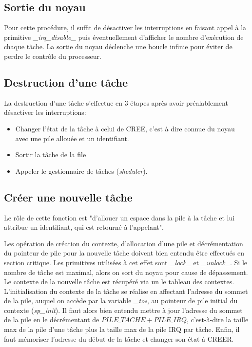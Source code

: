 \subsection{Sortie du noyau}
Pour cette procédure, il suffit de désactiver les interruptions en faisant appel à la primitive \textit{\_irq\_disable\_} puis éventuellement d'afficher le nombre d'exécution de chaque tâche. La sortie du noyau déclenche une boucle infinie pour éviter de perdre le contrôle du processeur.
%

\subsection{Destruction d'une tâche}
La destruction d'une tâche s'effectue en 3 étapes après avoir préalablement désactiver les interruptions:
\begin{itemize}
    \item Changer l'état de la tâche à celui de CREE, c'est à dire connue du noyau avec une pile allouée et un identifiant.
    \item Sortir la tâche de la file
    \item Appeler le gestionnaire de tâches (\textit{sheduler}).
\end{itemize}
%

\subsection{Créer une nouvelle tâche}
Le rôle de cette fonction est "d'allouer un espace dans la pile à la tâche et lui attribue un identifiant, qui est retourné à l’appelant".

Les opération de création du contexte, d'allocation d'une pile et décrémentation du pointeur de pile pour la nouvelle tâche doivent bien entendu être effectués en section critique. Les primitives utilisées à cet effet sont \textit{\_lock\_} et \textit{\_unlock\_}. Si le nombre de tâche est maximal, alors on sort du noyau pour cause de dépassement. Le contexte de la nouvelle tâche est récupéré via un le tableau des contextes. L'initialisation du contexte de la tâche se réalise en affectant l'adresse du sommet de la pile, auquel on accède par la variable \textit{\_tos}, au pointeur de pile initial du contexte (\textit{sp\_init}). Il faut alors bien entendu mettre à jour l'adresse du sommet de la pile en le décrémentant de $PILE\_TACHE + PILE\_IRQ$, c'est-à-dire la taille max de la pile d'une tâche plus la taille max de la pile IRQ par tâche.
Enfin, il faut mémoriser l'adresse du début de la tâche et changer son état à CREER.
%

